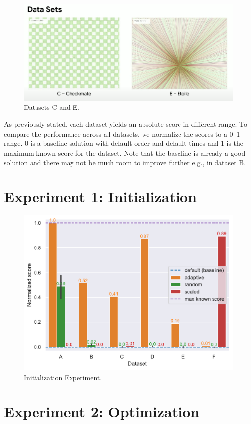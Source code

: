 \begin{figure}
    \centering
    \includegraphics[width=\linewidth]{img/screenshots/hashcode_datasets_c_e.png}
    \caption[Datasets C and E]{
        Datasets C and E\footnotemark.
        }
        \label{fig:hashcode_dataset_c_e}
    \end{figure}
    

\bigskip

As previously stated, each dataset yields an absolute score in different range. To compare the performance across all datasets, we normalize the scores to a 0--1 range. 0 is a baseline solution with default order and default times and 1 is the maximum known score for the dataset. Note that the baseline is already a good solution and there may not be much room to improve further e.g., in dataset B.

\section{Experiment 1: Initialization}

\begin{figure}
    \centering
    \includegraphics[width=\linewidth]{img/experiments/init_experiment.pdf}
    \caption[Initialization Experiment]{
        Initialization Experiment.
    }
    \label{fig:init_experiment}
\end{figure}

\section{Experiment 2: Optimization}
